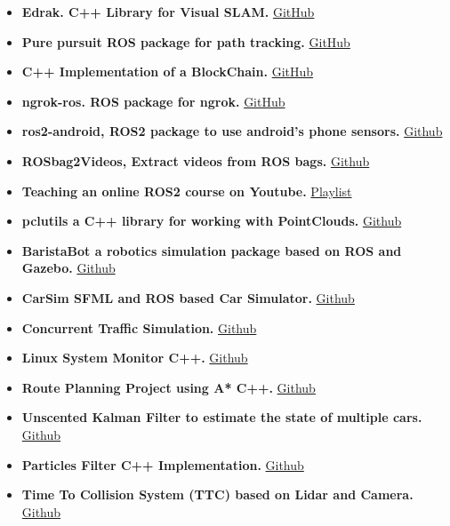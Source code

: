\documentclass[10pt,a4paper,ragged2e]{altacv}
\begin{document}
\begin{itemize}
\item \textbf{Edrak. C++ Library for Visual SLAM.}
\href{https://github.com/HemaZ/Edrak}{GitHub}
\item \textbf{Pure pursuit ROS package for path tracking.}
\href{https://github.com/HemaZ/pure_pursuit}{GitHub}
\item \textbf{C++ Implementation of a BlockChain.}
\href{https://github.com/HemaZ/my_blockchain}{GitHub}
\item \textbf{ngrok-ros. ROS package for ngrok.}
\href{https://github.com/HemaZ/ngrok_ros}{GitHub}
\item \textbf{ros2-android, ROS2 package to use android's phone sensors.}
\href{https://github.com/HemaZ/ros2_android}{Github}
\item \textbf{ROSbag2Videos, Extract videos from ROS bags.}
\href{https://github.com/HemaZ/rosbag_2_videos}{Github}
\item \textbf{Teaching an online ROS2 course on Youtube.}
\href{https://www.youtube.com/playlist?list=PLWIFvNcdSDQupEsNLnAnCI6MwTqvGgkC1}{Playlist}
\item \textbf{pclutils a C++ library for working with PointClouds.}
\href{https://github.com/HemaZ/pcl_utils}{Github}
\item \textbf{BaristaBot a robotics simulation package based on ROS and Gazebo.}
\href{https://github.com/HemaZ/BaristaBot}{Github}
\item \textbf{CarSim SFML and ROS based Car Simulator.}
\href{https://github.com/HemaZ/CarSim}{Github}
\item \textbf{Concurrent Traffic Simulation.}
\href{https://github.com/HemaZ/Concurrent-Traffic-Simulation-CPP}{Github}
\item \textbf{Linux System Monitor C++.}
\href{https://github.com/HemaZ/CppND-System-Monitor}{Github}
\item \textbf{Route Planning Project using A* C++.}
\href{https://github.com/HemaZ/CppND-Route-Planning-Project}{Github}
\item \textbf{Unscented Kalman Filter to estimate the state of multiple cars.}
\href{https://github.com/HemaZ/SFND_Unscented_Kalman_Filter}{Github}
\item \textbf{Particles Filter C++ Implementation.}
\href{https://github.com/HemaZ/particles_filter}{Github}
\item \textbf{Time To Collision System (TTC) based on Lidar and Camera.}
\href{https://github.com/HemaZ/SFND_3D_Object_Tracking}{Github}


\end{itemize}
\end{document}

